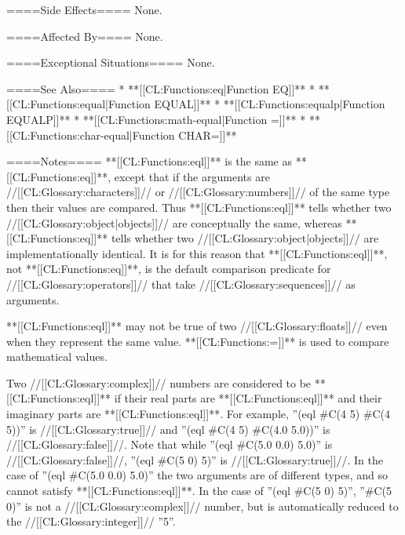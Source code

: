 ====Side Effects====
None.

====Affected By====
None.

====Exceptional Situations====
None.

====See Also====
  * **[[CL:Functions:eq|Function EQ]]**
  * **[[CL:Functions:equal|Function EQUAL]]**
  * **[[CL:Functions:equalp|Function EQUALP]]**
  * **[[CL:Functions:math-equal|Function =]]**
  * **[[CL:Functions:char-equal|Function CHAR=]]**

====Notes====
**[[CL:Functions:eql]]** is the same as **[[CL:Functions:eq]]**, except that if the arguments are //[[CL:Glossary:characters]]// or //[[CL:Glossary:numbers]]// of the same type then their values are compared. Thus **[[CL:Functions:eql]]** tells whether two //[[CL:Glossary:object|objects]]// are conceptually the same, whereas **[[CL:Functions:eq]]** tells whether two //[[CL:Glossary:object|objects]]// are implementationally identical. It is for this reason that **[[CL:Functions:eql]]**, not **[[CL:Functions:eq]]**, is the default comparison predicate for //[[CL:Glossary:operators]]// that take //[[CL:Glossary:sequences]]// as arguments.

**[[CL:Functions:eql]]** may not be true of two //[[CL:Glossary:floats]]// even when they represent the same value. **[[CL:Functions:=]]** is used to compare mathematical values.

Two //[[CL:Glossary:complex]]// numbers are considered to be **[[CL:Functions:eql]]** if their real parts are **[[CL:Functions:eql]]** and their imaginary parts are **[[CL:Functions:eql]]**. For example, ''(eql #C(4 5) #C(4 5))'' is //[[CL:Glossary:true]]// and ''(eql #C(4 5) #C(4.0 5.0))'' is //[[CL:Glossary:false]]//. Note that while ''(eql #C(5.0 0.0) 5.0)'' is //[[CL:Glossary:false]]//, ''(eql #C(5 0) 5)'' is //[[CL:Glossary:true]]//. In the case of ''(eql #C(5.0 0.0) 5.0)'' the two arguments are of different types, and so cannot satisfy **[[CL:Functions:eql]]**. In the case of ''(eql #C(5 0) 5)'', ''#C(5 0)'' is not a //[[CL:Glossary:complex]]// number, but is automatically reduced to the //[[CL:Glossary:integer]]// ''5''.

